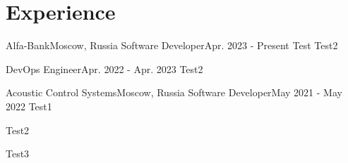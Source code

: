 

\section{Experience}\label{sec:experience}
\resumeSubHeadingListStart

\resumeSubheading
{Alfa-Bank}{Moscow, Russia}
    {Software Developer}{Apr. 2023 - Present}
    \resumeItemListStart
        {Test}
        {Test2}
    \resumeItemListEnd

    \resumeSubSubheading
    {DevOps Engineer}{Apr. 2022 - Apr. 2023}
    \resumeItemListStart
        {Test2}
    \resumeItemListEnd

\resumeSubheading
{Acoustic Control Systems}{Moscow, Russia}
    {Software Developer}{May 2021 - May 2022}
    \resumeItemListStart
        {Test1}

        {Test2}

        {Test3}
    \resumeItemListEnd

\resumeSubHeadingListEnd
